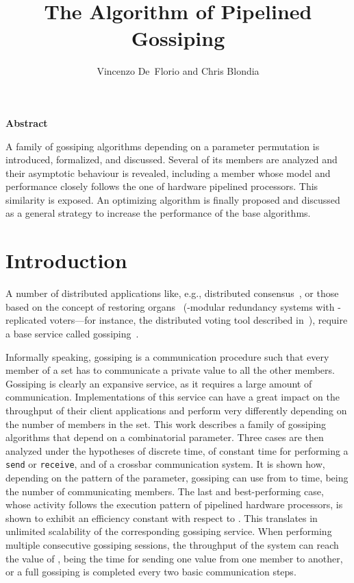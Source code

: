 \documentclass{elsart}
\begin{document}
\begin{frontmatter}
\title{The Algorithm of Pipelined Gossiping}
\author{Vincenzo De~Florio and Chris Blondia}
\address{University of Antwerp\\
 Department of Mathematics and Computer Science\\
 Performance Analysis of Telecommunication Systems group\\
 Middelheimlaan 1, 2020 Antwerp, Belgium, \emph{and}\\
 Interdisciplinary institute for BroadBand Technology\\
 Crommenlaan 8, 9050 Ghent-Ledeberg, Belgium.}
\end{frontmatter}

\noindent
\centerline{\bf Abstract}

\noindent
A family of gossiping algorithms depending on a parameter permutation
is introduced, formalized, and discussed. Several of its members
are analyzed and their asymptotic behaviour is revealed, including
a member whose model and performance closely follows the one of
hardware pipelined processors. This similarity is exposed. An optimizing
algorithm is finally proposed and discussed as 
a general strategy to increase the
performance of the base algorithms.


\section{Introduction}
A number of distributed applications like, e.g.,
distributed consensus~\cite{LaSP82}, or those based on the concept
of restoring organs~\cite{DeDL00c,John89a} (-modular redundancy systems
with -replicated voters---for instance, the distributed voting
tool described in~\cite{DeDL98e}),
require a base service called gossiping~\cite{Goss,BGRV98,Gon03}.

Informally speaking, gossiping is a communication procedure such that
every member of a set has to communicate a private value to all
the other members. Gossiping is clearly an expansive service,
as it requires a large amount of communication. Implementations
of this service can have a great impact on the throughput
of their client applications and perform very differently
depending on the number of members in the set.
This work describes a family of gossiping algorithms that
depend on a combinatorial parameter.
Three cases are then analyzed under the hypotheses of discrete
time, of constant time for performing a \verb"send" or
\verb"receive", and of a crossbar communication system.
It is shown how, depending on the pattern of the parameter,
gossiping can use from  to  time,
 being the number of communicating members.
The last and best-performing case, whose activity follows the
execution pattern of pipelined hardware processors, is shown
to exhibit an efficiency constant with respect to .
This translates in unlimited scalability of the corresponding
gossiping service. When performing multiple consecutive gossiping
sessions, the throughput of the system can reach the value
of ,  being the time for sending one value from
one member to another, or a full gossiping is completed
every two basic communication steps.
\end{document}
